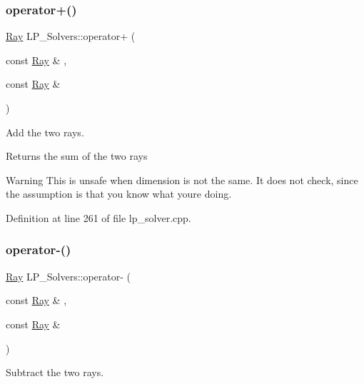 \subsubsection{\texorpdfstring{operator+()}{operator+()}}
{\footnotesize\ttfamily \hyperlink{group___c_l_s_solvers_class_l_p___solvers_1_1_ray}{Ray} L\+P\+\_\+\+Solvers\+::operator+ (\begin{DoxyParamCaption}\item[{const \hyperlink{group___c_l_s_solvers_class_l_p___solvers_1_1_ray}{Ray} \&}]{,  }\item[{const \hyperlink{group___c_l_s_solvers_class_l_p___solvers_1_1_ray}{Ray} \&}]{ }\end{DoxyParamCaption})}



Add the two rays. 

\begin{DoxyReturn}{Returns}
the sum of the two rays 
\end{DoxyReturn}
\begin{DoxyWarning}{Warning}
This is unsafe when dimension is not the same. It does not check, since the assumption is that you know what you\textquotesingle{}re doing. 
\end{DoxyWarning}


Definition at line 261 of file lp\+\_\+solver.\+cpp.

\mbox{\label{group___c_l_s_solvers_gac20f6443d37909c326bb31c0399ea634}} 
\subsubsection{\texorpdfstring{operator-\/()}{operator-()}}
{\footnotesize\ttfamily \hyperlink{group___c_l_s_solvers_class_l_p___solvers_1_1_ray}{Ray} L\+P\+\_\+\+Solvers\+::operator-\/ (\begin{DoxyParamCaption}\item[{const \hyperlink{group___c_l_s_solvers_class_l_p___solvers_1_1_ray}{Ray} \&}]{,  }\item[{const \hyperlink{group___c_l_s_solvers_class_l_p___solvers_1_1_ray}{Ray} \&}]{ }\end{DoxyParamCaption})}



Subtract the two rays. 

